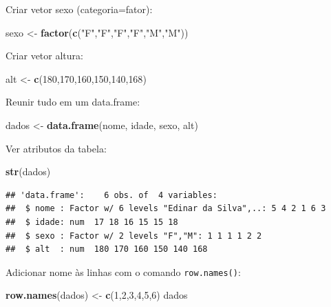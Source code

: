 \documentclass[
]{book}
\newenvironment{Shaded}{\begin{snugshade}}{\end{snugshade}}
\newcommand{\DecValTok}[1]{\textcolor[rgb]{0.00,0.00,0.81}{#1}}
\newcommand{\KeywordTok}[1]{\textcolor[rgb]{0.13,0.29,0.53}{\textbf{#1}}}
\newcommand{\NormalTok}[1]{#1}
\newcommand{\StringTok}[1]{\textcolor[rgb]{0.31,0.60,0.02}{#1}}
\begin{document}
Criar vetor sexo (categoria=fator):

\begin{Shaded}
\begin{Highlighting}[]
\NormalTok{sexo <-}\StringTok{ }\KeywordTok{factor}\NormalTok{(}\KeywordTok{c}\NormalTok{(}\StringTok{"F"}\NormalTok{,}\StringTok{"F"}\NormalTok{,}\StringTok{"F"}\NormalTok{,}\StringTok{"F"}\NormalTok{,}\StringTok{"M"}\NormalTok{,}\StringTok{"M"}\NormalTok{))}
\end{Highlighting}
\end{Shaded}

Criar vetor altura:

\begin{Shaded}
\begin{Highlighting}[]
\NormalTok{alt <-}\StringTok{ }\KeywordTok{c}\NormalTok{(}\DecValTok{180}\NormalTok{,}\DecValTok{170}\NormalTok{,}\DecValTok{160}\NormalTok{,}\DecValTok{150}\NormalTok{,}\DecValTok{140}\NormalTok{,}\DecValTok{168}\NormalTok{)}
\end{Highlighting}
\end{Shaded}

Reunir tudo em um data.frame:

\begin{Shaded}
\begin{Highlighting}[]
\NormalTok{dados <-}\StringTok{ }\KeywordTok{data.frame}\NormalTok{(nome, idade, sexo, alt)}
\end{Highlighting}
\end{Shaded}

Ver atributos da tabela:

\begin{Shaded}
\begin{Highlighting}[]
\KeywordTok{str}\NormalTok{(dados)}
\end{Highlighting}
\end{Shaded}

\begin{verbatim}
## 'data.frame':    6 obs. of  4 variables:
##  $ nome : Factor w/ 6 levels "Edinar da Silva",..: 5 4 2 1 6 3
##  $ idade: num  17 18 16 15 15 18
##  $ sexo : Factor w/ 2 levels "F","M": 1 1 1 1 2 2
##  $ alt  : num  180 170 160 150 140 168
\end{verbatim}

Adicionar nome às linhas com o comando \texttt{row.names()}:

\begin{Shaded}
\begin{Highlighting}[]
\KeywordTok{row.names}\NormalTok{(dados) <-}\StringTok{ }\KeywordTok{c}\NormalTok{(}\DecValTok{1}\NormalTok{,}\DecValTok{2}\NormalTok{,}\DecValTok{3}\NormalTok{,}\DecValTok{4}\NormalTok{,}\DecValTok{5}\NormalTok{,}\DecValTok{6}\NormalTok{)}
\NormalTok{dados}
\end{Highlighting}
\end{Shaded}
\end{document}
